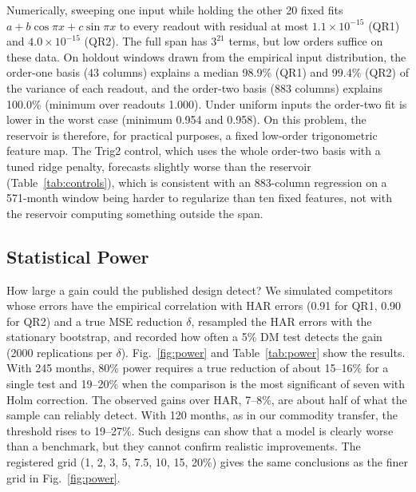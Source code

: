 \documentclass{ieeeaccess}
\begin{document}
Numerically, sweeping one input while holding the other 20 fixed fits $a+b\cos\pi x+c\sin\pi x$ to every readout with residual at most $1.1\times10^{-15}$ (QR1) and $4.0\times10^{-15}$ (QR2). The full span has $3^{21}$ terms, but low orders suffice on these data. On holdout windows drawn from the empirical input distribution, the order-one basis (43 columns) explains a median 98.9\% (QR1) and 99.4\% (QR2) of the variance of each readout, and the order-two basis (883 columns) explains 100.0\% (minimum over readouts 1.000). Under uniform inputs the order-two fit is lower in the worst case (minimum 0.954 and 0.958). On this problem, the reservoir is therefore, for practical purposes, a fixed low-order trigonometric feature map. The Trig2 control, which uses the whole order-two basis with a tuned ridge penalty, forecasts slightly worse than the reservoir (Table~\ref{tab:controls}), which is consistent with an 883-column regression on a 571-month window being harder to regularize than ten fixed features, not with the reservoir computing something outside the span.

\subsection{Statistical Power}
\label{sec:res-power}
How large a gain could the published design detect? We simulated competitors whose errors have the empirical correlation with HAR errors (0.91 for QR1, 0.90 for QR2) and a true MSE reduction $\delta$, resampled the HAR errors with the stationary bootstrap, and recorded how often a 5\% DM test detects the gain (2000 replications per $\delta$). Fig.~\ref{fig:power} and Table~\ref{tab:power} show the results. With 245 months, 80\% power requires a true reduction of about 15--16\% for a single test and 19--20\% when the comparison is the most significant of seven with Holm correction. The observed gains over HAR, 7--8\%, are about half of what the sample can reliably detect. With 120 months, as in our commodity transfer, the threshold rises to 19--27\%. Such designs can show that a model is clearly worse than a benchmark, but they cannot confirm realistic improvements. The registered grid (1, 2, 3, 5, 7.5, 10, 15, 20\%) gives the same conclusions as the finer grid in Fig.~\ref{fig:power}.
\end{document}
